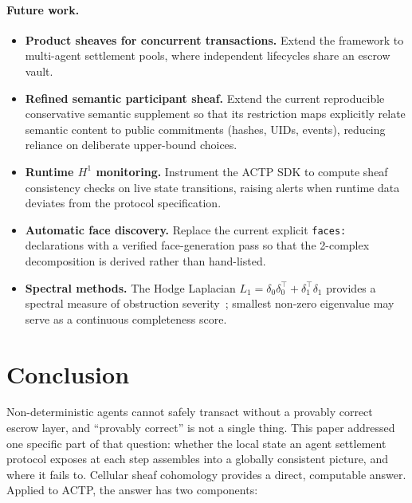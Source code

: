 \documentclass[11pt]{article}
\theoremstyle{plain}
\theoremstyle{definition}
\newcommand{\Hone}{H^{1}}
\newcommand{\deltazero}{\delta_{0}}
\newcommand{\deltaone}{\delta_{1}}
\begin{document}
\paragraph{Future work.}
\begin{itemize}
  \item \textbf{Product sheaves for concurrent transactions.}  Extend the
        framework to multi-agent settlement pools, where independent lifecycles
        share an escrow vault.
  \item \textbf{Refined semantic participant sheaf.} Extend the current
        reproducible conservative semantic supplement so that its restriction
        maps explicitly relate semantic content to public commitments (hashes,
        UIDs, events), reducing reliance on deliberate upper-bound choices.
  \item \textbf{Runtime $\Hone$ monitoring.}  Instrument the ACTP SDK to
        compute sheaf consistency checks on live state transitions, raising
        alerts when runtime data deviates from the protocol specification.
  \item \textbf{Automatic face discovery.} Replace the current explicit
        \texttt{faces:} declarations with a verified face-generation pass so
        that the 2-complex decomposition is derived rather than hand-listed.
  \item \textbf{Spectral methods.}  The Hodge Laplacian $L_1 = \deltazero
        \deltazero^\top + \deltaone^\top \deltaone$ provides a spectral measure
        of obstruction severity~\cite{HansenGhrist2019}; smallest non-zero
        eigenvalue may serve as a continuous completeness score.
\end{itemize}

\section{Conclusion}
\label{sec:conclusion}

Non-deterministic agents cannot safely transact without a provably correct
escrow layer, and ``provably correct'' is not a single thing.  This paper
addressed one specific part of that question: whether the local state an
agent settlement protocol exposes at each step assembles into a globally
consistent picture, and where it fails to.  Cellular sheaf cohomology
provides a direct, computable answer.  Applied to ACTP, the answer has two
components:
\end{document}
